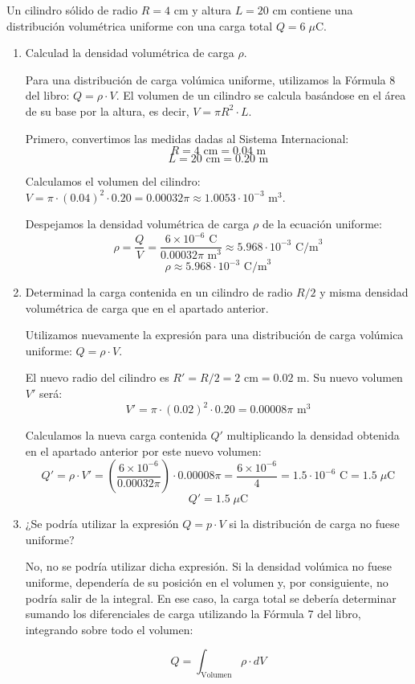 \documentclass[11pt, a4paper]{article}
\newenvironment{problem}[1][Cuestión]{
		\vspace{0.5cm}
		\noindent{\Large\bfseries #1} \par\vspace{0.5cm}
}{
		\vspace{0.5cm}
}
\begin{document}
	\begin{problem}[Cuestión 1]
		Un cilindro sólido de radio $R = 4$ cm y altura $L= 20$ cm contiene una distribución volumétrica uniforme con una carga total $Q=6 \; \mu$C.

		\begin{enumerate}[label=\alph*)] 
			\item Calculad la densidad volumétrica de carga $\rho$.

				{ \color{blue} 
					Para una distribución de carga volúmica uniforme, utilizamos la Fórmula 8 del libro: $Q = \rho \cdot V$. 
					El volumen de un cilindro se calcula basándose en el área de su base por la altura, es decir, $V = \pi R^2 \cdot L$.

					Primero, convertimos las medidas dadas al Sistema Internacional:
					$$R = 4 \text{ cm} = 0.04 \text{ m}$$
					$$L = 20 \text{ cm} = 0.20 \text{ m}$$

					Calculamos el volumen del cilindro:
					$V = \pi \cdot (0.04)^2 \cdot 0.20 = 0.00032\pi \approx 1.0053 \cdot 10^{-3} \text{ m}^3$.

					Despejamos la densidad volumétrica de carga $\rho$ de la ecuación uniforme:
					$$\rho = \frac{Q}{V} = \frac{6 \times 10^{-6} \text{ C}}{0.00032\pi \text{ m}^3} \approx 5.968 \cdot 10^{-3} \text{ C/m}^3$$
					$$\boxed{\rho \approx 5.968 \cdot 10^{-3} \text{ C/m}^3}$$
				}

			\item Determinad la carga contenida en un cilindro de radio $R/2$ y misma densidad volumétrica de carga que en el apartado anterior.

				{ \color{blue} 
					 Utilizamos nuevamente la expresión para una distribución de carga volúmica uniforme: $Q = \rho \cdot V$.

					 El nuevo radio del cilindro es $R' = R/2 = 2 \text{ cm} = 0.02 \text{ m}$.
					 Su nuevo volumen $V'$ será:
					 $$V' = \pi \cdot (0.02)^2 \cdot 0.20 = 0.00008\pi \text{ m}^3$$

					 Calculamos la nueva carga contenida $Q'$ multiplicando la densidad obtenida en el apartado anterior por este nuevo volumen:
					 $$Q' = \rho \cdot V' = \left(\frac{6 \times 10^{-6}}{0.00032\pi}\right) \cdot 0.00008\pi = \frac{6 \times 10^{-6}}{4} = 1.5 \cdot 10^{-6} \text{ C} = 1.5 \; \mu\text{C}$$
					 $$\boxed{Q' = 1.5 \; \mu \text{C}}$$
				}

			\item ¿Se podría utilizar la expresión $Q=p \cdot V$ si la distribución de carga no fuese uniforme? 

				{ \color{blue} 
					No, no se podría utilizar dicha expresión. Si la densidad volúmica no fuese uniforme, dependería de su posición en el volumen y, por consiguiente, no podría salir de la integral. En ese caso, la carga total se debería determinar sumando los diferenciales de carga utilizando la Fórmula 7 del libro, integrando sobre todo el volumen: 

					$$Q = \int_{\text{Volumen}} \rho \cdot dV$$
				}
		\end{enumerate}
	\end{problem}
\end{document}
